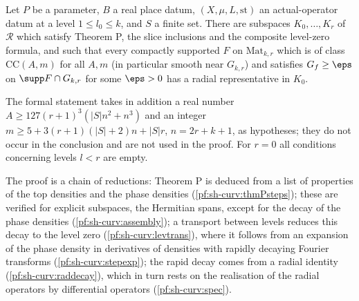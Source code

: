 \begin{theorem}\label{pf:sh-curv:actualcpt}
Let $P$ be a parameter, $B$ a real place datum, $(X,\mu,L,\mathrm{st})$ an actual-operator datum at a level $1\le l_0\le k$, and
$S$ a finite set. There are subspaces $K_0,\dots,K_r$ of $\mathcal R$ which satisfy Theorem P, the slice inclusions and the
composite level-zero formula, and such that every compactly supported $F$ on $\mathrm{Mat}_{k,r}$ which is of class
$\mathrm{CC}(A,m)$ for all $A,m$ (in particular smooth near $G_{k,r}$) and satisfies $G_f\ge\eps$ on $\supp F\cap G_{k,r}$ for
some $\eps>0$ has a radial representative in $K_0$.
\end{theorem}

\begin{remark}\label{pf:sh-curv:actualcpt-rem}
The formal statement takes in addition a real number $A\ge127(r+1)^3(|S|n^2+n^3)$ and an integer
$m\ge5+3(r+1)(|S|+2)n+|S|r$, $n=2r+k+1$, as hypotheses; they do not occur in the conclusion and are not used in the proof.
For $r=0$ all conditions concerning levels $l<r$ are empty.
\end{remark}

The proof is a chain of reductions: Theorem P is deduced from a list of properties of the top densities and the phase densities
(\cref{pf:sh-curv:thmPsteps}); these are verified for explicit subspaces, the Hermitian spans, except for the decay of the
phase densities (\cref{pf:sh-curv:assembly}); a transport between levels reduces this decay to the level zero
(\cref{pf:sh-curv:levtrans}), where it follows from an expansion of the phase density in derivatives of densities with
rapidly decaying Fourier transforms (\cref{pf:sh-curv:stepexp}); the rapid decay comes from a radial identity
(\cref{pf:sh-curv:raddecay}), which in turn rests on the realisation of the radial operators by differential operators
(\cref{pf:sh-curv:spec}).

